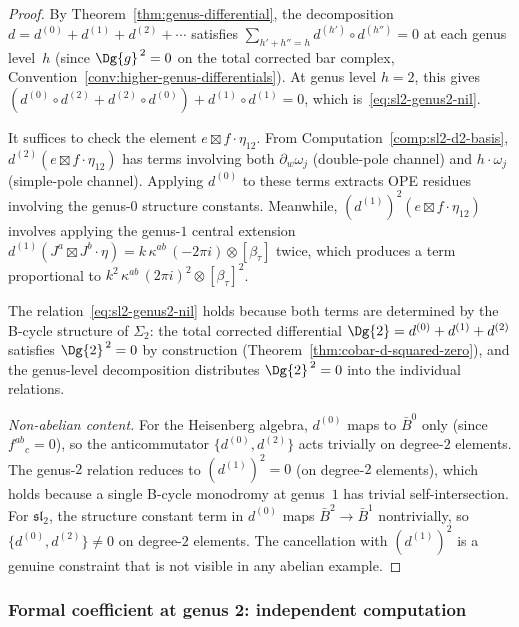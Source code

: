 \begin{proof}
By Theorem~\ref{thm:genus-differential}, the decomposition
$d = d^{(0)} + d^{(1)} + d^{(2)} + \cdots$ satisfies
$\sum_{h'+h''=h} d^{(h')} \circ d^{(h'')} = 0$ at each genus
level~$h$ (since $\Dg{g}^{\,2} = 0$ on the total corrected bar complex, Convention~\ref{conv:higher-genus-differentials}).
At genus level $h = 2$, this gives
$(d^{(0)} \circ d^{(2)} + d^{(2)} \circ d^{(0)}) + d^{(1)} \circ d^{(1)} = 0$,
which is~\eqref{eq:sl2-genus2-nil}.

It suffices to check the element $e \boxtimes f \cdot \eta_{12}$.
From Computation~\ref{comp:sl2-d2-basis},
$d^{(2)}(e \boxtimes f \cdot \eta_{12})$ has
terms involving both $\partial_w\omega_j$ (double-pole channel)
and $h \cdot \omega_j$ (simple-pole channel). Applying $d^{(0)}$
to these terms extracts OPE residues involving the genus-$0$
structure constants. Meanwhile, $(d^{(1)})^2(e \boxtimes f \cdot \eta_{12})$
involves applying the genus-$1$ central extension
$d^{(1)}(J^a \boxtimes J^b \cdot \eta)
= k\,\kappa^{ab}\, (-2\pi i) \otimes [\beta_{\tau}]$
twice, which produces a term proportional to
$k^2\,\kappa^{ab}\, (2\pi i)^2 \otimes [\beta_\tau]^2$.

The relation~\eqref{eq:sl2-genus2-nil} holds because both terms are
determined by the B-cycle structure of $\Sigma_2$:
the total corrected differential $\Dg{2} = d^{(0)} + d^{(1)} + d^{(2)}$ satisfies
$\Dg{2}^{\,2} = 0$ by construction (Theorem~\ref{thm:cobar-d-squared-zero}),
and the genus-level decomposition distributes $\Dg{2}^{\,2} = 0$ into
the individual relations.

\emph{Non-abelian content.}
For the Heisenberg algebra, $d^{(0)}$ maps to
$\bar{B}^0$ only (since $f^{ab}{}_c = 0$), so the anticommutator
$\{d^{(0)}, d^{(2)}\}$ acts trivially on degree-$2$ elements.
The genus-$2$ relation reduces to $(d^{(1)})^2 = 0$
(on degree-$2$ elements), which holds because a single B-cycle
monodromy at genus~$1$ has trivial self-intersection.
For $\mathfrak{sl}_2$, the structure constant term in $d^{(0)}$
maps $\bar{B}^2 \to \bar{B}^1$ nontrivially, so
$\{d^{(0)}, d^{(2)}\} \neq 0$ on degree-$2$ elements.
The cancellation with $(d^{(1)})^2$ is a genuine constraint
that is not visible in any abelian example.
\end{proof}

\subsubsection{Formal coefficient at genus 2: independent computation}

